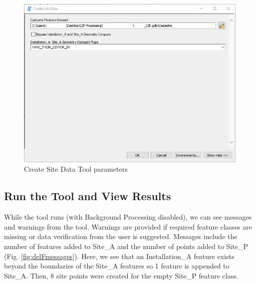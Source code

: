 \documentclass[openany]{book}
\theoremstyle{definition}
\theoremstyle{definition}
\theoremstyle{definition}
\theoremstyle{remark}
\begin{document}
\begin{figure}[H]

{\centering \includegraphics{figures/csd-params} 

}

\caption{Create Site Data Tool parameters}\label{fig:csdparams}
\end{figure}

\subsection{Run the Tool and View
Results}\label{run-the-tool-and-view-results}

While the tool runs (with Background Processing disabled), we can see
messages and warnings from the tool. Warnings are provided if required
feature classes are missing or data verification from the user is
suggested. Messages include the number of features added to Site\_A and
the number of points added to Site\_P (Fig. \ref{fig:delFmessages}).
Here, we see that an Installation\_A feature exists beyond the
boundaries of the Site\_A features so 1 feature is appended to Site\_A.
Then, 8 site points were created for the empty Site\_P feature class.
\end{document}
